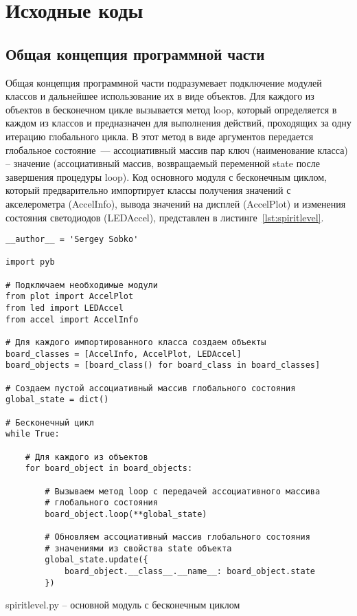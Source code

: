 \documentclass[document.tex]{subfiles}
\begin{document}
\section{Исходные коды}
\subsection{Общая концепция программной части}
Общая концепция программной части подразумевает подключение модулей классов и дальнейшее использование их в виде объектов. Для каждого из объектов в бесконечном цикле вызывается
метод loop, который определяется в каждом из классов и предназначен для выполнения действий, проходящих за одну итерацию глобального цикла. В этот метод в виде аргументов
передается глобальное состояние~--- ассоциативный массив пар ключ (наименование класса) -- значение (ассоциативный массив, возвращаемый переменной state после завершения процедуры
loop). Код основного модуля с бесконечным циклом, который предварительно импортирует классы получения значений с акселерометра (AccelInfo), вывода значений на дисплей (AccelPlot) и
изменения состояния светодиодов (LEDAccel), пред\-ставлен в листинге~\ref{lst:spiritlevel}.

\begin{listing}[ht]
\begin{verbatim}
__author__ = 'Sergey Sobko'

import pyb

# Подключаем необходимые модули
from plot import AccelPlot
from led import LEDAccel
from accel import AccelInfo

# Для каждого импортированного класса создаем объекты
board_classes = [AccelInfo, AccelPlot, LEDAccel]
board_objects = [board_class() for board_class in board_classes]

# Создаем пустой ассоциативный массив глобального состояния
global_state = dict()

# Бесконечный цикл
while True:
    
    # Для каждого из объектов
    for board_object in board_objects:

        # Вызываем метод loop с передачей ассоциативного массива 
        # глобального состояния
        board_object.loop(**global_state)
        
        # Обновляем ассоциативный массив глобального состояния
        # значениями из свойства state объекта
        global_state.update({
            board_object.__class__.__name__: board_object.state
        })
\end{verbatim}
\caption{spiritlevel.py -- основной модуль с бесконечным циклом}
\label{lst:spiritlevel}
\end{listing}
\end{document}
